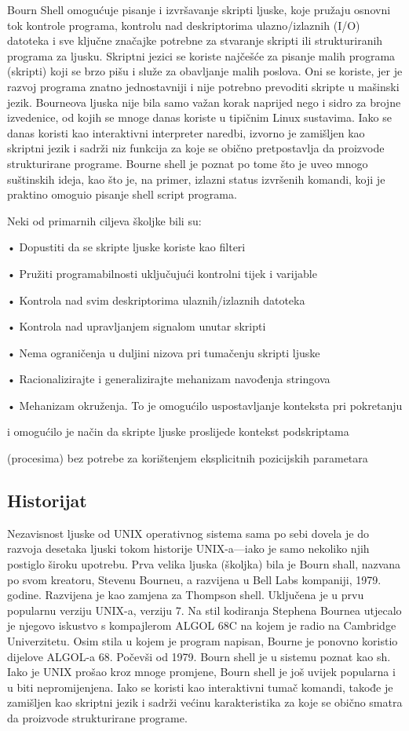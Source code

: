 \documentclass[11pt]{book}
\begin{document}
Bourn Shell omogućuje pisanje i izvršavanje skripti ljuske, koje pružaju osnovni tok kontrole programa, kontrolu nad deskriptorima ulazno/izlaznih (I/O) datoteka i sve ključne značajke potrebne za stvaranje skripti ili strukturiranih programa za ljusku.
Skriptni jezici se koriste najčešće za pisanje malih programa (skripti) koji se brzo pišu i služe za obavljanje malih poslova. Oni se koriste, jer je razvoj programa znatno jednostavniji i nije potrebno prevoditi skripte u mašinski jezik.
Bourneova ljuska nije bila samo važan korak naprijed nego i sidro za brojne izvedenice, od kojih se mnoge danas koriste u tipičnim Linux sustavima.
Iako se danas koristi kao interaktivni interpreter naredbi, izvorno je zamišljen kao skriptni jezik i sadrži niz funkcija za koje se obično pretpostavlja da proizvode strukturirane programe.
Bourne shell je poznat po tome što je uveo mnogo suštinskih ideja, kao što je, na primer, izlazni status izvršenih komandi, koji je praktino omoguio pisanje shell script programa.



Neki od primarnih ciljeva školjke bili su:

•	Dopustiti da se skripte ljuske koriste kao filteri

•	Pružiti programabilnosti uključujući kontrolni tijek i varijable 

•	Kontrola nad svim deskriptorima ulaznih/izlaznih datoteka 

•	Kontrola nad upravljanjem signalom unutar skripti 

•	Nema ograničenja u duljini nizova pri tumačenju skripti ljuske

•	Racionalizirajte i generalizirajte mehanizam navođenja stringova 

•	Mehanizam okruženja. To je omogućilo uspostavljanje konteksta pri pokretanju

i omogućilo je način da skripte ljuske proslijede kontekst podskriptama

(procesima) bez potrebe za korištenjem eksplicitnih pozicijskih parametara


\subsection{Historijat}

Nezavisnost ljuske od UNIX operativnog sistema sama po sebi dovela je do razvoja desetaka ljuski tokom historije UNIX-a—iako je samo nekoliko njih postiglo široku upotrebu. Prva velika ljuska (školjka) bila je Bourn shall, nazvana po svom kreatoru, Stevenu Bourneu, a razvijena u Bell Labs kompaniji, 1979. godine. Razvijena je kao zamjena za Thompson shell. Uključena je u prvu popularnu verziju UNIX-a, verziju 7. Na stil kodiranja Stephena Bournea utjecalo je njegovo iskustvo s kompajlerom ALGOL 68C na kojem je radio na Cambridge Univerzitetu. Osim stila u kojem je program napisan, Bourne je ponovno koristio dijelove ALGOL-a 68. Počevši od 1979. Bourn shell je u sistemu poznat kao sh. Iako je UNIX prošao kroz mnoge promjene, Bourn shell je još uvijek popularna i u biti nepromijenjena. 
Iako se koristi kao interaktivni tumač komandi, takođe je zamišljen kao skriptni jezik i sadrži većinu karakteristika za koje se obično smatra da proizvode strukturirane programe. 
\end{document}
